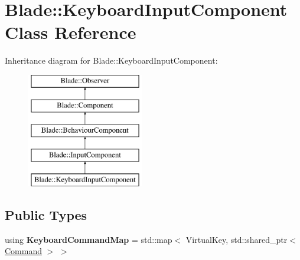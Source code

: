 \hypertarget{class_blade_1_1_keyboard_input_component}{}\section{Blade\+:\+:Keyboard\+Input\+Component Class Reference}
\label{class_blade_1_1_keyboard_input_component}
Inheritance diagram for Blade\+:\+:Keyboard\+Input\+Component\+:\begin{figure}[H]
\begin{center}
\leavevmode
\includegraphics[height=5.000000cm]{class_blade_1_1_keyboard_input_component}
\end{center}
\end{figure}
\subsection*{Public Types}
\begin{DoxyCompactItemize}
\item 
\mbox{\label{class_blade_1_1_keyboard_input_component_ae4c93cd11eba12bbf832b25977cd6ff4}} 
using {\bfseries Keyboard\+Command\+Map} = std\+::map$<$ Virtual\+Key, std\+::shared\+\_\+ptr$<$ \hyperlink{class_blade_1_1_command}{Command} $>$ $>$
\end{DoxyCompactItemize}
